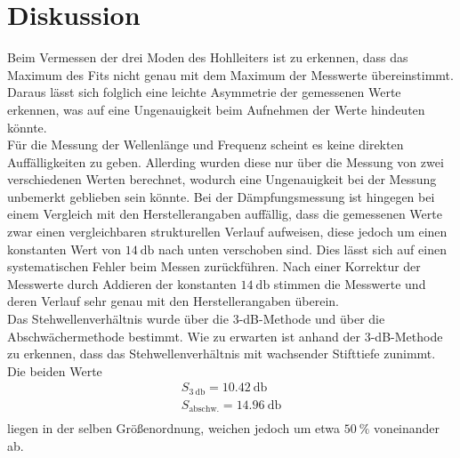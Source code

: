 \section{Diskussion}
\label{sec:Diskussion}

Beim Vermessen der drei Moden des Hohlleiters ist zu erkennen, dass das Maximum des Fits nicht genau mit dem Maximum der Messwerte übereinstimmt.
Daraus lässt sich folglich eine leichte Asymmetrie der gemessenen Werte erkennen, was auf eine Ungenauigkeit beim Aufnehmen der Werte hindeuten könnte.
\\
Für die Messung der Wellenlänge und Frequenz scheint es keine direkten Auffälligkeiten zu geben. Allerding wurden diese nur über die Messung von 
zwei verschiedenen Werten berechnet, wodurch eine Ungenauigkeit bei der Messung unbemerkt geblieben sein könnte. Bei der Dämpfungsmessung ist 
hingegen bei einem Vergleich mit den Herstellerangaben auffällig, dass die gemessenen Werte zwar einen vergleichbaren strukturellen Verlauf 
aufweisen, diese jedoch um einen konstanten Wert von $\SI{14}{\decibel}$ nach unten verschoben sind. Dies lässt sich auf einen systematischen 
Fehler beim Messen zurückführen. Nach einer Korrektur der Messwerte durch Addieren der konstanten $\SI{14}{\decibel}$ stimmen die Messwerte und 
deren Verlauf sehr genau mit den Herstellerangaben überein. 
\\
Das Stehwellenverhältnis wurde über die 3-dB-Methode und über die Abschwächermethode bestimmt. Wie zu erwarten ist anhand der 3-dB-Methode zu erkennen, 
dass das Stehwellenverhältnis mit wachsender Stifttiefe zunimmt. 
Die beiden Werte 
\begin{align*}
    S_{\SI{3}{\decibel}} = \SI{10.42}{\decibel} \\
    S_{\text{abschw.}} = \SI{14.96}{\decibel} \\
\end{align*}
liegen in der selben Größenordnung, weichen jedoch um etwa $\SI{50}{\percent}$ voneinander ab. 